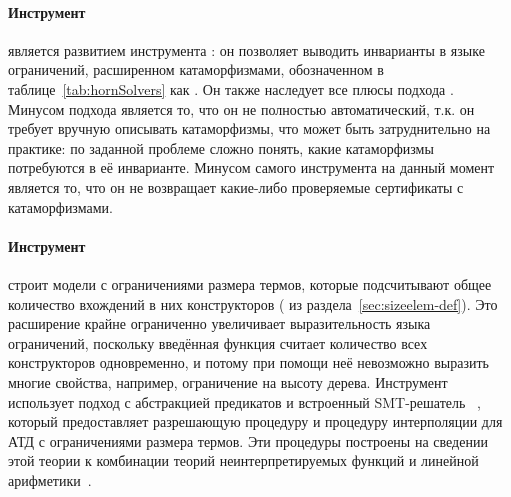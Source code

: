 \paragraph{Инструмент \racer{}~\cite{10.1145/3498722}} является развитием инструмента \spacer{}: он позволяет выводить инварианты в языке ограничений, расширенном катаморфизмами, обозначенном в таблице~\ref{tab:hornSolvers} как \catelemclass{}. Он также наследует все плюсы подхода \spacer{}. Минусом подхода является то, что он не полностью автоматический, т.к. он требует вручную описывать катаморфизмы, что может быть затруднительно на практике: по заданной проблеме сложно понять, какие катаморфизмы потребуются в её инварианте. Минусом самого инструмента на данный момент является то, что он не возвращает какие-либо проверяемые сертификаты с катаморфизмами.

\paragraph{Инструмент \eldarica{}~\cite{8603013}} строит модели с ограничениями размера термов, которые подсчитывают общее количество вхождений в них конструкторов (\sizeelemclass{} из раздела~\cref{sec:sizeelem-def}).
Это расширение крайне ограниченно увеличивает выразительность языка ограничений, поскольку введённая функция считает количество всех конструкторов одновременно, и потому при помощи неё невозможно выразить многие свойства, например, ограничение на высоту дерева.
Инструмент \eldarica{} использует подход \cegar{} с абстракцией предикатов и встроенный SMT-решатель \princess{}~\cite{princess}, который предоставляет разрешающую процедуру и процедуру интерполяции для АТД с ограничениями размера термов. Эти процедуры построены на сведении этой теории к комбинации теорий неинтерпретируемых функций и линейной арифметики~\cite{hojjat2017deciding}.


